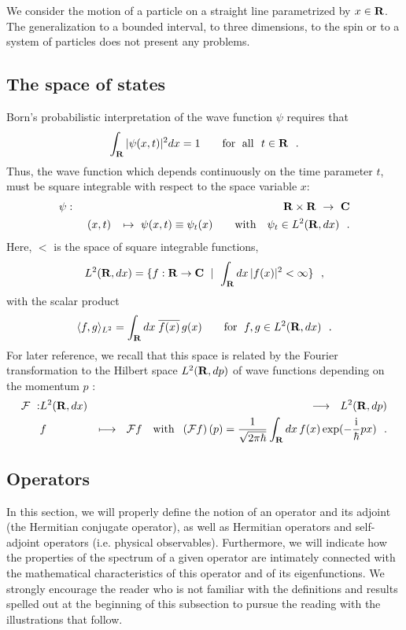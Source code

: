 \documentclass[a4wide,12pt]{report}
\begin{document}
We consider the motion of a particle on a straight line parametrized by 
$x \in {\bf R}$. The generalization to a bounded interval, to three
dimensions, to the spin or to a system of particles does not present
any problems.

\subsection{The space of states}
 
Born's probabilistic interpretation  
of the wave function $\psi$
requires that 
\[
\int _{{\bf R}} | \psi (x,t)|^2 dx =1 
\qquad {\rm for \ \; all} \ \ t \in {\bf R} 
\ \ .
\]
Thus, the wave function which depends continuously on 
the time parameter $t$, must be  
square integrable with respect to the space variable $x$:
\begin{eqnarray*}
\psi & : & {\bf R} \times {\bf R} \ \to \ {\bf C}
\\
& & \ (x, t) \ \ \, \mapsto \ \psi (x,t) \equiv \psi_t (x)
\qquad {\rm with} \quad \psi_t \in L ^2 ({\bf R} , dx )
\ \ .
\end{eqnarray*}
Here, $\lt$ is 
the space of square integrable functions,  
$$
\lt = \{ f: {\bf R} \to {\bf C} \ \mid \ \int_{{\bf R}} dx \,
| f(x) |^2 < \infty \}
\ \ ,
$$
with the scalar product
\begin{equation}
\label{ip}
\langle
f, g \rangle _{L^2} = \int_{{\bf R}} dx \; \overline{f(x)} \, g(x)
\qquad \mbox{for} \ \; f,g \in {L^2 ({{\bf R}},dx)}
\ \ .
\end{equation}
For later reference, we recall that 
this space is related by the Fourier transformation to the Hilbert
space 
$L^2 ({\bf R} , dp )$ of wave functions depending on the momentum  $p$ :
\begin{eqnarray}
\label{f}
{\cal F} \ : & {L^2 ({{\bf R}},dx)} & \longrightarrow \ \ L^2 ( {{\bf R}}, dp)
\\
 & f & \longmapsto \ \  {\cal F} f
\quad {\rm with} \ \;
\left( {\cal F} f \right) (p)
= {1 \over \sqrt{2\pi \hbar}} \int_{{\bf R}} dx \, f(x) \,
{\rm exp} (-{{\rm i} \over \hbar}px )
\ \ .
\nonumber
\end{eqnarray}
 



 
\subsection{Operators}

In this section, we will properly define the notion of an 
operator and its adjoint (the Hermitian conjugate operator), 
as well as Hermitian operators 
and self-adjoint operators (i.e. physical 
observables).
Furthermore, we will indicate how the properties of the spectrum 
of a given operator are intimately connected 
with the mathematical characteristics of this operator and 
of its eigenfunctions.   
 We strongly encourage the 
reader who is not familiar with the 
definitions and results spelled out 
at the beginning of this subsection 
to pursue the reading 
with the illustrations that follow.  
\end{document}
